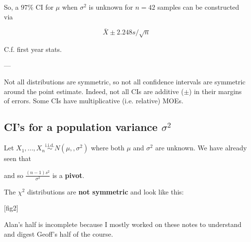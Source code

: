 So, a \(97\%\) CI for \(\mu\) when \(\sigma^2\) is unknown for \(n=42\) samples can be constructed via 

\begin{equation*}
    \bar{X} \pm 2.248s/\sqrt{n}
\end{equation*}

C.f. first year stats.

---

Not all distributions are symmetric, so not all confidence intervals are symmetric around the point estimate. 
Indeed, not all CIs are additive (\(\pm\)) in their margins of errors. Some CIs have multiplicative (i.e. relative) MOEs.

\subsection{CI's for a population variance \texorpdfstring{\(\sigma^2\)}{sigma\^2}} \label{subsec:CI for sigma}

Let \(X_1,...,X_n \overset{\text{i.i.d.}}{\sim} N(\mu,,\sigma^2)\) where both \(\mu\) and \(\sigma^2\) are unknown. 
We have already seen that 

    

and so \(\frac{(n-1)s^2}{\sigma^2}\) is a \textbf{pivot}. 

The \(\chi^2\) distributions are \textbf{not symmetric} and look like this:

[fig2]

Alan's half is incomplete because I mostly worked on these notes to understand and digest Geoff's half of the course. 